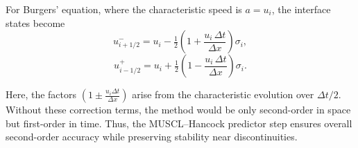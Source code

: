 \documentclass{article}
\begin{document}
For Burgers' equation, where the characteristic speed is $a = u_i$, the interface states become
\begin{equation}
u_{i+1/2}^- = u_i - \tfrac{1}{2}\!\left(1 + \frac{u_i \,\Delta t}{\Delta x}\right)\sigma_i,
\end{equation}
\begin{equation}
u_{i-1/2}^+ = u_i + \tfrac{1}{2}\!\left(1 - \frac{u_i \,\Delta t}{\Delta x}\right)\sigma_i.
\end{equation}

Here, the factors $\left(1 \pm \tfrac{u_i \Delta t}{\Delta x}\right)$ arise from the characteristic evolution over $\Delta t/2$. Without these correction terms, the method would be only second-order in space but first-order in time. Thus, the MUSCL--Hancock predictor step ensures overall second-order accuracy while preserving stability near discontinuities.
\end{document}
